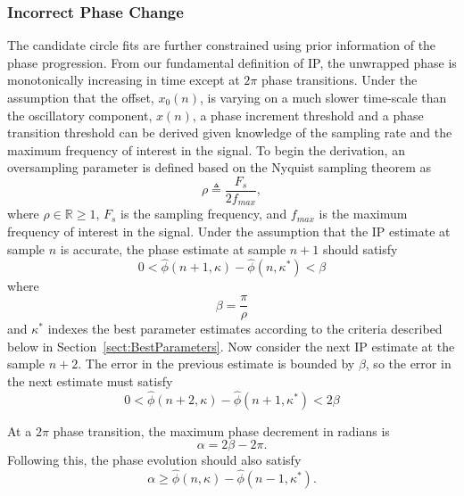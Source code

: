 \documentclass[journal,11pt,a4paper,onecolumn,draftcls]{IEEEtran}
\begin{document}
\subsubsection{Incorrect Phase Change}
The candidate circle fits are further constrained using prior information of the phase progression. From our fundamental definition of IP, the unwrapped phase is monotonically increasing in time except at $2\pi$ phase transitions. Under the assumption that the offset, $x_0(n)$, is varying on a much slower time-scale than the oscillatory component, $x(n)$, a phase increment threshold and a phase transition threshold can be derived given knowledge of the sampling rate and the maximum frequency of interest in the signal. To begin the derivation, an oversampling parameter is defined based on the Nyquist sampling theorem as
\begin{equation}
	\rho\triangleq\frac{F_s}{2f_{max}},
\end{equation}
where $\rho \in \mathbb{R} \ge 1$, $F_s$ is the sampling frequency, and $f_{max}$ is the maximum frequency of interest in the signal. Under the assumption that the IP estimate at sample $n$ is accurate, the phase estimate at sample $n+1$ should satisfy
\begin{equation}
	0 < \hat\phi(n+1,\kappa)-\hat\phi(n,\kappa^*) < \beta
\end{equation}
where 
\begin{equation}
	\beta = \frac{\pi}{\rho}
\end{equation}
and $\kappa^*$ indexes the best parameter estimates according to the criteria described below in Section~\ref{sect:BestParameters}. Now consider the next IP estimate at the sample $n+2$. The error in the previous estimate is bounded by $\beta$, so the error in the next estimate must satisfy
\begin{equation}\label{eq:Prior1}
	0 < \hat\phi(n+2,\kappa)-\hat\phi(n+1,\kappa^*) < 2\beta
\end{equation} 

At a $2\pi$ phase transition, the maximum phase decrement in radians is
\begin{equation}
	\alpha=2\beta-2\pi.
\end{equation}
Following this, the phase evolution should also satisfy
\begin{equation}\label{eq:Prior2}
\alpha \ge \hat{\phi} \left( n,\kappa \right) - \hat{\phi} \left( n-1,\kappa^* \right). 
\end{equation}
\end{document}
